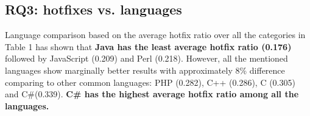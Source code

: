 \documentclass{sig-alternate}
\begin{document}



\subsection{RQ3: hotfixes vs. languages}
Language comparison based on the average hotfix ratio over all the categories in Table 1 has shown that \textbf{Java has the least average hotfix ratio (0.176)} followed by JavaScript (0.209) and Perl (0.218). However, all the mentioned languages show marginally better results with approximately 8\% difference comparing to other common languages: PHP (0.282), C++ (0.286), C (0.305) and C\#(0.339). \textbf{C\# has the highest average hotfix ratio among all the languages.}
\end{document}
